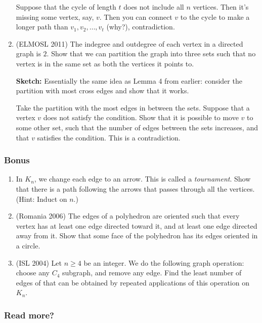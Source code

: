 \documentclass[11pt,paper=letter]{scrartcl}
\begin{document}
\begin{enumerate}
  Suppose that the cycle of length $t$ does not include all $n$ vertices. Then it's missing some vertex, say, $v$. Then you can connect $v$ to the cycle to make a longer path than $v_1, v_2, \ldots, v_t$ (why?), contradiction.

  \item (ELMOSL 2011) The indegree and outdegree of each vertex in a directed graph is $2$. Show that we can partition the graph into three sets such that no vertex is in the same set as both the vertices it points to.

  \textbf{Sketch:} Essentially the same idea as Lemma 4 from earlier: consider the partition with most cross edges and show that it works.

  Take the partition with the most edges in between the sets. Suppose that a vertex $v$ does not satisfy the condition. Show that it is possible to move $v$ to some other set, such that the number of edges between the sets increases, and that $v$ satisfies the condition. This is a contradiction.
\end{enumerate}

\subsubsection*{Bonus}

\begin{enumerate}
  \item In $K_n$, we change each edge to an arrow. This is called a \emph{tournament}. Show that there is a path following the arrows that passes through all the vertices. (Hint: Induct on $n$.)

  \item (Romania 2006) The edges of a polyhedron are oriented such that every vertex has at least one edge directed toward it, and at least one edge directed away from it. Show that some face of the polyhedron has its edges oriented in a circle.

  \item (ISL 2004) Let $n \ge 4$ be an integer. We do the following graph operation: choose any $C_4$ subgraph, and remove any edge. Find the least number of edges of that can be obtained by repeated applications of this operation on $K_n$.
\end{enumerate}

\subsubsection*{Read more?}
\end{document}

